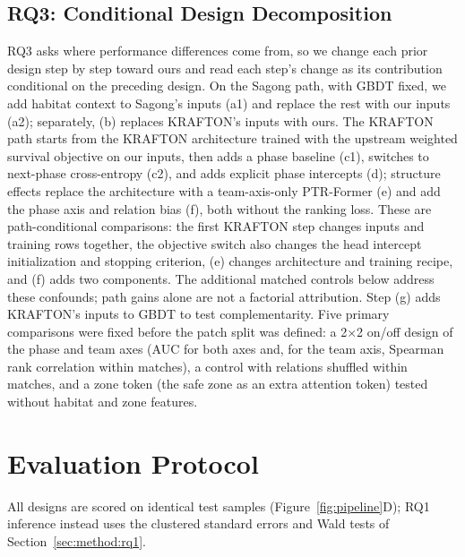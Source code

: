 \documentclass[sigconf,anonymous,nonacm]{acmart}
\begin{document}
\subsection{RQ3: Conditional Design Decomposition}
\label{sec:method:decomposition}
RQ3 asks where performance differences come from, so we change each prior design step by step toward ours and read each step's change as its contribution conditional on the preceding design.
On the Sagong path, with GBDT fixed, we add habitat context to Sagong's inputs (a1) and replace the rest with our inputs (a2); separately, (b) replaces KRAFTON's inputs with ours.
The KRAFTON path starts from the KRAFTON architecture trained with the upstream weighted survival objective on our inputs, then adds a phase baseline (c1), switches to next-phase cross-entropy (c2), and adds explicit phase intercepts (d); structure effects replace the architecture with a team-axis-only PTR-Former (e) and add the phase axis and relation bias (f), both without the ranking loss.
These are path-conditional comparisons: the first KRAFTON step changes inputs and training rows together, the objective switch also changes the head intercept initialization and stopping criterion, (e) changes architecture and training recipe, and (f) adds two components. The additional matched controls below address these confounds; path gains alone are not a factorial attribution.
Step (g) adds KRAFTON's inputs to GBDT to test complementarity.
Five primary comparisons were fixed before the patch split was defined: a 2$\times$2 on/off design of the phase and team axes (AUC for both axes and, for the team axis, Spearman rank correlation within matches), a control with relations shuffled within matches, and a zone token (the safe zone as an extra attention token) tested without habitat and zone features.

\section{Evaluation Protocol}
\label{sec:method:evaluation}
All designs are scored on identical test samples (Figure~\ref{fig:pipeline}D); RQ1 inference instead uses the clustered standard errors and Wald tests of Section~\ref{sec:method:rq1}.
\end{document}
